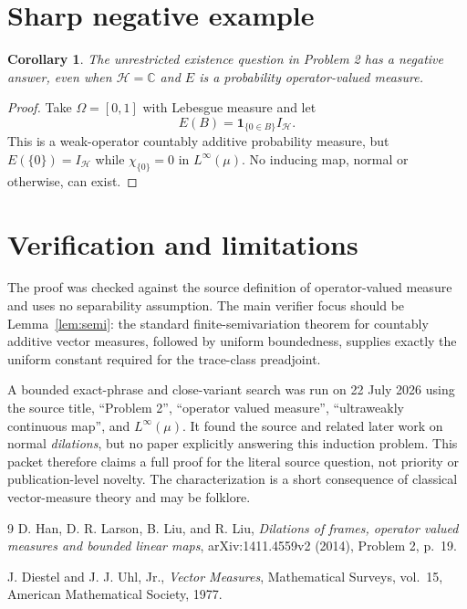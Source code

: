 \documentclass[11pt]{article}
\newtheorem{corollary}{Corollary}
\begin{document}
\section{Sharp negative example}

\begin{corollary}
The unrestricted existence question in Problem 2 has a negative answer, even
when $\mathcal H=\mathbb C$ and $E$ is a probability operator-valued measure.
\end{corollary}

\begin{proof}
Take $\Omega=[0,1]$ with Lebesgue measure and let
\[
 E(B)=\mathbf 1_{\{0\in B\}}I_{\mathcal H}.
\]
This is a weak-operator countably additive probability measure, but
$E(\{0\})=I_{\mathcal H}$ while $\chi_{\{0\}}=0$ in $L^\infty(\mu)$.
No inducing map, normal or otherwise, can exist.
\end{proof}

\section{Verification and limitations}

The proof was checked against the source definition of operator-valued
measure and uses no separability assumption.  The main verifier focus should
be Lemma~\ref{lem:semi}: the standard finite-semivariation theorem for
countably additive vector measures, followed by uniform boundedness, supplies
exactly the uniform constant required for the trace-class preadjoint.

A bounded exact-phrase and close-variant search was run on 22 July 2026 using
the source title, ``Problem 2'', ``operator valued measure'',
``ultraweakly continuous map'', and $L^\infty(\mu)$.  It found the source and
related later work on normal \emph{dilations}, but no paper explicitly
answering this induction problem.  This packet therefore claims a full proof
for the literal source question, not priority or publication-level novelty.
The characterization is a short consequence of classical vector-measure
theory and may be folklore.

\begin{thebibliography}{9}
D. Han, D. R. Larson, B. Liu, and R. Liu,
\emph{Dilations of frames, operator valued measures and bounded linear maps},
arXiv:1411.4559v2 (2014), Problem 2, p.~19.

J. Diestel and J. J. Uhl, Jr.,
\emph{Vector Measures}, Mathematical Surveys, vol.~15,
American Mathematical Society, 1977.
\end{thebibliography}
\end{document}
